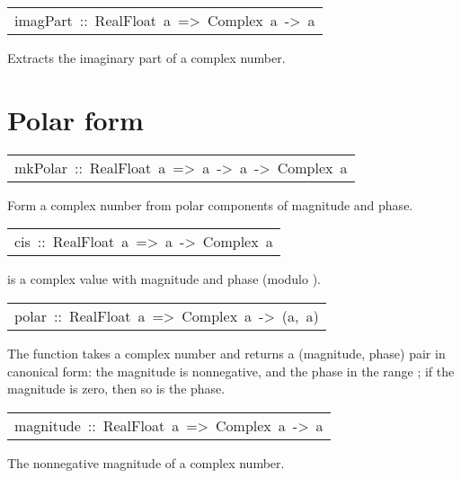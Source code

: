 \begin{haddockdesc}
\item[\begin{tabular}{@{}l}
imagPart\ ::\ RealFloat\ a\ =>\ Complex\ a\ ->\ a
\end{tabular}]\haddockbegindoc
Extracts the imaginary part of a complex number.
\par

\end{haddockdesc}
\section{Polar form
}
\begin{haddockdesc}
\item[\begin{tabular}{@{}l}
mkPolar\ ::\ RealFloat\ a\ =>\ a\ ->\ a\ ->\ Complex\ a
\end{tabular}]\haddockbegindoc
Form a complex number from polar components of magnitude and phase.
\par

\end{haddockdesc}
\begin{haddockdesc}
\item[\begin{tabular}{@{}l}
cis\ ::\ RealFloat\ a\ =>\ a\ ->\ Complex\ a
\end{tabular}]\haddockbegindoc
{} is a complex value with magnitude 
 and phase  (modulo ).
\par

\end{haddockdesc}
\begin{haddockdesc}
\item[\begin{tabular}{@{}l}
polar\ ::\ RealFloat\ a\ =>\ Complex\ a\ ->\ (a,\ a)
\end{tabular}]\haddockbegindoc
The function  takes a complex number and
 returns a (magnitude, phase) pair in canonical form:
 the magnitude is nonnegative, and the phase in the range ;
 if the magnitude is zero, then so is the phase.
\par

\end{haddockdesc}
\begin{haddockdesc}
\item[\begin{tabular}{@{}l}
magnitude\ ::\ RealFloat\ a\ =>\ Complex\ a\ ->\ a
\end{tabular}]\haddockbegindoc
The nonnegative magnitude of a complex number.
\par

\end{haddockdesc}
